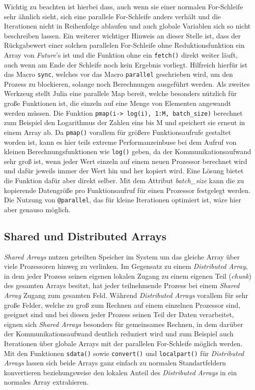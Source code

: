 \documentclass[proseminar,german,utf8]{zihpub}
\begin{document}
Wichtig zu beachten ist hierbei dass, auch wenn sie einer normalen For-Schleife sehr ähnlich sieht, sich eine parallele For-Schleife anders verhält und die Iterationen nicht in Reihenfolge ablaufen und auch globale Variablen sich so nicht beschreiben lassen. Ein weiterer wichtiger Hinweis an dieser Stelle ist, dass der Rückgabewert einer solchen parallelen For-Schleife ohne Reduktionsfunktion ein Array von \textit{Future}'s ist und die Funktion ohne ein \verb|fetch()| direkt weiter läuft, auch wenn am Ende der Schleife noch kein Ergebnis vorliegt. Hilfreich hierfür ist das Macro \verb|sync|, welches vor das Macro \verb|parallel| geschrieben wird, um den Prozess zu blockieren, solange noch Berechnungen ausgeführt werden. Als zweites Werkzeug stellt Julia eine parallele Map bereit, welche besonders nützlich für große Funktionen ist, die einzeln auf eine Menge von Elementen angewandt werden müssen. Die Funktion \verb|pmap(i-> log(i), 1:M, batch_size)| berechnet zum Beispiel den Logarithmus der Zahlen eins bis M und speichert sie erneut in einem Array ab. Da \verb|pmap()| vorallem für größere Funktionsaufrufe gestaltet worden ist, kann es hier teils extreme Performanzeinbuse bei dem Aufruf von kleinen Berechnungsfunktionen wie \verb|log()| geben, da der Kommunikationsaufwand sehr groß ist, wenn jeder Wert einzeln auf einem neuen Prozessor berechnet wird und dafür jeweils immer der Wert hin und her kopiert wird. Eine Lösung bietet die Funktion dafür aber direkt selber. Mit dem Attribut \textit{batch\_size} kann die zu kopierende Datengröße pro Funktionsaufruf für einen Prozessor festgelegt werden. Die Nutzung von \verb|@parallel|, das für kleine Iterationen optimiert ist, wäre hier aber genauso möglich.~\cite{JuliaLangDocumentation}

\subsection{Shared und Distributed Arrays}

\textit{Shared Arrays} nutzen geteilten Speicher im System um das gleiche Array über viele Prozessoren hinweg zu verlinken. Im Gegensatz zu einem \textit{Distributed Array}, in dem jeder Prozess seinen eigenen lokalen Zugang zu einem eigenen Teil (\textit{chunk}) des gesamten Arrays besitzt, hat jeder teilnehmende Prozess bei einem \textit{Shared Array} Zugang zum gesamten Feld. Während \textit{Distributed Arrays} vorallem für sehr große Felder, welche zu groß zum Rechnen auf einem einzelnen Prozessor sind, geeignet sind und bei diesen jeder Prozess seinen Teil der Daten verarbeitet, eignen sich \textit{Shared Arrays} besonders für gemeinsames Rechnen, in dem darüber der Kommunikationsaufwand deutlich reduziert wird und zum Beispiel auch Iterationen über globale Arrays mit der parallelen For-Schleife möglich werden. Mit den Funktionen \verb|sdata()| sowie \verb|convert()| und \verb|localpart()| für \textit{Distributed Arrays} lassen sich beide Arrays ganz einfach zu normalen Standartfeldern konvertieren beziehungsweise den lokalen Anteil des\textit{ Distributed Arrays} in ein normales Array extrahieren. ~\cite{JuliaLangDocumentation}
\end{document}
